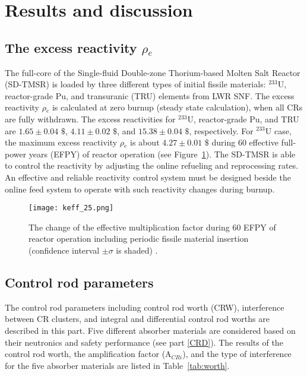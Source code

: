 \section{Results and discussion} \label{Results-and-discussion}

\subsection{The excess reactivity $\rho$$_e$}

The full-core of the Single-fluid Double-zone Thorium-based Molten Salt Reactor (SD-TMSR) is loaded by three different types of initial fissile materials: $^{233}$U, reactor-grade Pu, and transuranic (TRU) elements from \gls{LWR} \gls{SNF}.
The excess reactivity $\rho$$_e$ is calculated at zero burnup (steady state calculation), when all CRs are fully withdrawn. The excess reactivities for $^{233}$U, reactor-grade Pu, and TRU are $1.65\pm0.04$ $\$$, $4.11\pm0.02$ $\$$, and $15.38\pm0.04$ $\$$, respectively. For $^{233}$U case, the maximum excess reactivity $\rho$$_e$ is about $4.27\pm0.01$ $\$$ during 60 effective full-power years (EFPY) of reactor operation (see Figure~\ref{fig:keff_25}). The SD-TMSR is able to control the reactivity by adjusting the online refueling and reprocessing rates. An effective and reliable reactivity control system must be designed beside the online feed system to operate with such reactivity changes during burnup.

\begin{figure}
	\centering
	\texttt{[image: keff\_25.png]}
	\vspace{-0.5in}
	\caption{The change of the effective multiplication factor during 60 EFPY of reactor operation including periodic fissile material insertion (confidence interval $\pm\sigma$ is shaded) \cite{ashraf2019whole_core}.} 
	\label{fig:keff_25}
\end{figure}

\subsection{Control rod parameters}

The control rod parameters including control rod worth (CRW), interference between CR clusters, and integral and differential control rod worths are described in this part. Five different absorber materials are considered based on their neutronics and safety performance (see part \ref{CRD}). The results of the control rod worth, the amplification factor (A$_{CRi}$), and the type of interference for the five absorber materials are listed in Table~\ref{tab:worth}.

